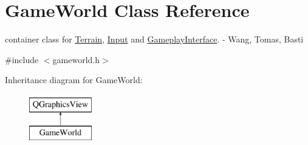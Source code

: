 \hypertarget{class_game_world}{}\section{Game\+World Class Reference}
\label{class_game_world}


container class for \hyperlink{class_terrain}{Terrain}, \hyperlink{class_input}{Input} and \hyperlink{class_gameplay_interface}{Gameplay\+Interface}. -\/ Wang, Tomas, Basti  




{\ttfamily \#include $<$gameworld.\+h$>$}

Inheritance diagram for Game\+World\+:\begin{figure}[H]
\begin{center}
\leavevmode
\includegraphics[height=2.000000cm]{class_game_world}
\end{center}
\end{figure}
